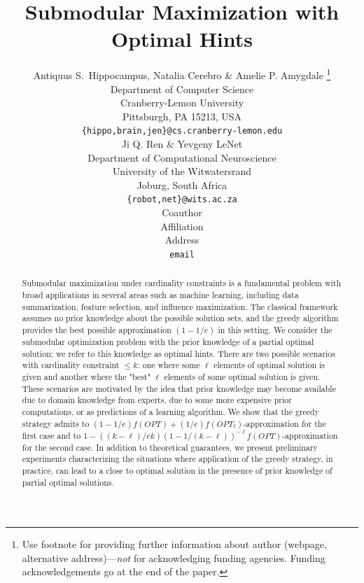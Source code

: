 \documentclass{article} %
\title{Submodular Maximization with Optimal Hints}
\author{Antiquus S.~Hippocampus, Natalia Cerebro \& Amelie P. Amygdale \thanks{ Use footnote for providing further information
about author (webpage, alternative address)---\emph{not} for acknowledging
funding agencies.  Funding acknowledgements go at the end of the paper.} \\
Department of Computer Science\\
Cranberry-Lemon University\\
Pittsburgh, PA 15213, USA \\
\texttt{\{hippo,brain,jen\}@cs.cranberry-lemon.edu} \\
\And
Ji Q. Ren \& Yevgeny LeNet \\
Department of Computational Neuroscience \\
University of the Witwatersrand \\
Joburg, South Africa \\
\texttt{\{robot,net\}@wits.ac.za} \\
\AND
Coauthor \\
Affiliation \\
Address \\
\texttt{email}
}
\begin{document}
\maketitle

\begin{abstract}
Submodular maximization under cardinality constraints is a fundamental problem with broad applications in several areas such as machine learning, including data summarization, feature selection, and influence maximization. The classical framework assumes no prior knowledge about the possible solution sets, and the greedy algorithm provides the best possible approximation $(1-1/e)$ 
in this setting. We consider the submodular optimization problem with the prior knowledge of a partial optimal solution; we refer to this knowledge as optimal hints.  
There are two possible scenarios with cardinality constraint $\leq k$: 
one where some $\ell$ elements of optimal solution is given and another where  the "best" $\ell$ elements of some optimal solution is given. These scenarios are motivated by the idea that prior knowledge may become available due to domain knowledge from experts,  due to some more expensive prior computations, or as predictions of a learning algorithm. We show that the greedy strategy admits to 
$(1-1/e)f(OPT) + (1/e) f(OPT_{\ell})$-approximation for the first case and to $1 - ((k-\ell)/ek) (1 - 1/(k-\ell))^{-\ell}f(OPT)$-approximation for the second case. In addition to theoretical guarantees, we present preliminary experiments characterizing the situations where application of the greedy strategy, in practice, can lead to a close to optimal solution  in the presence of prior knowledge of partial optimal solutions. 



\end{abstract}
\end{document}
